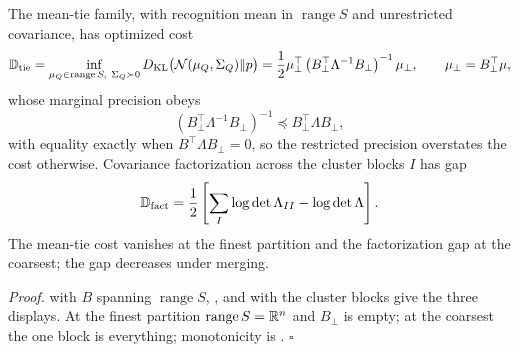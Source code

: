 The mean-tie family, with recognition mean in \(\operatorname{range}S\) and
unrestricted covariance, has optimized cost
\begin{equation}
\mathbb D_{\rm tie}
=\inf_{\mu_Q\in\operatorname{range}S,\ \Sigma_Q\succ0}
D_{\mathrm{KL}}\bigl(\mathcal N(\mu_Q,\Sigma_Q)\Vert p\bigr)
=\frac12\mu_\perp^\top
\left(B_\perp^\top\Lambda^{-1}B_\perp\right)^{-1}\mu_\perp,
\qquad
\mu_\perp=B_\perp^\top\mu,
\label{eq:cg-mean-tie-cost}
\end{equation}
whose marginal precision obeys
\begin{equation}
\left(B_\perp^\top\Lambda^{-1}B_\perp\right)^{-1}
\preceq B_\perp^\top\Lambda B_\perp,
\label{eq:cg-loewner}
\end{equation}
with equality exactly when \(B^\top\Lambda B_\perp=0\), so the restricted
precision overstates the cost otherwise. Covariance factorization across the
cluster blocks \(I\) has gap
\begin{equation}
\mathbb D_{\rm fact}
=\frac12\left[
\sum_I\log\det\Lambda_{II}-\log\det\Lambda
\right].
\label{eq:cg-factorization-gap}
\end{equation}
The mean-tie cost vanishes at the finest partition and the factorization gap
at the coarsest; the gap decreases under merging. 

\noindent\emph{Proof.}
 with \(B\) spanning \(\operatorname{range}S\),
, and
 with the cluster blocks give the three
displays. At the finest partition \(\operatorname{range}S=\mathbb R^n\) and
\(B_\perp\) is empty; at the coarsest the one block is everything; monotonicity
is . \(\square\)

